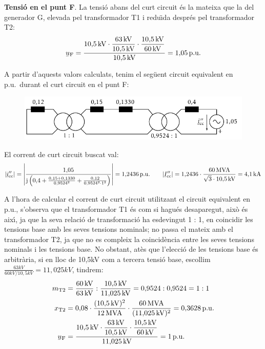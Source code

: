 \begin{exemple}
\textbf{Tensi\'{o} en el punt F}. La tensi\'{o} abans del curt circuit \'{e}s la mateixa que la del generador G, elevada pel transformador T1 i redu\"{\i}da despr\'{e}s pel transformador T2:
\[
\cmplx{u}\ped{F} = \frac{10{,}5\unit{kV} \cdot
\dfrac{63\unit{kV}}{10{,}5\unit{kV}} \cdot
\dfrac{10{,}5\unit{kV}}{60\unit{kV}}}{10{,}5\unit{kV}} =
1{,}05\unit{p.u.}
\]

A partir d'aquests valors calculats, tenim el seg\"{u}ent circuit equivalent en p.u.\ durant el
curt circuit en el punt F:
\begin{figure}[h]
\vspace{3mm} \centering
   \includegraphics{Imatges/Cap-Fonaments-pu-Circuit2.pdf}
\end{figure}


El corrent de curt circuit buscat val:
\[
|\cmplx{i}''\ped{cc}| = \left| \frac{1{,}05}{\ju \left( 0{,}4 + \frac{0{,}15 + 0{,}1330}{0{,}9524^2} + \frac{0{,}12}{0{,}9524^2 \cdot 1^2} \right)} \right| = 1{,}2436\unit{p.u.} \qquad |\cmplx{I}''\ped{cc}| = 1{,}2436\cdot\frac{60\unit{MVA}}{\sqrt{3}\cdot 10{,}5\unit{kV}} = 4{,}1\unit{kA}
\]

 A l'hora de calcular el corrent de curt circuit utilitzant el circuit equivalent en p.u.,
 s'observa que el transformador T1 \'{e}s com si hagu\'{e}s desaparegut,
 aix\`{o} \'{e}s aix\'{\i}, ja que la seva relaci\'{o} de transformaci\'{o} ha esdevingut
 1 : 1, en coincidir les tensions base amb les seves tensions nominals;
 no passa el mateix amb el transformador T2, ja que no es compleix
 la coincid\`{e}ncia entre les seves tensions nominals i les tensions
 base. No obstant, at\`{e}s que l'elecci\'{o} de les tensions base \'{e}s
 arbitr\`{a}ria, si en lloc de 10,5\unit{kV} com a tercera tensi\'{o} base,
 escollim
 $\frac{63\unit{kV}}{60\unit{kV} / 10{,}5\unit{kV}}=11{,}025\unit{kV}$,
 tindrem:
\begin{align*}
   m\ped{T2} &= \frac{60\unit{kV}}{63\unit{kV}} : \frac{10{,}5\unit{kV}}{11{,}025\unit{kV}}
   = 0{,}9524:0{,}9524 = 1:1 \\
   x\ped{T2} &= 0{,}08 \cdot \frac{(10{,}5\unit{kV})^2}{12\unit{MVA}} \cdot
   \frac{60\unit{MVA}}{(11{,}025\unit{kV})^2}  = 0{,}3628\unit{p.u.}\\
   \cmplx{u}\ped{F} &= \frac{10{,}5\unit{kV} \cdot \dfrac{63\unit{kV}}{10{,}5\unit{kV}} \cdot
   \dfrac{10{,}5\unit{kV}}{60\unit{kV}}}{11{,}025\unit{kV}} = 1\unit{p.u.}
\end{align*}


\end{exemple}
